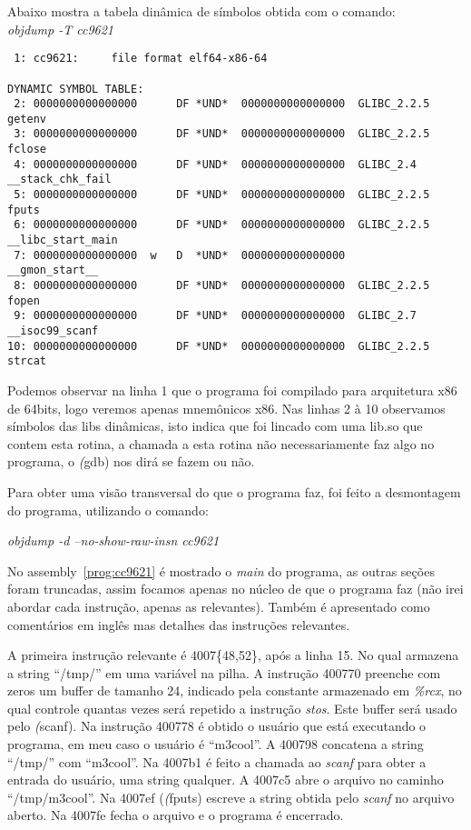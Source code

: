 Abaixo mostra a tabela dinâmica de símbolos obtida com o comando:\\
\emph{objdump -T cc9621}

\begin{verbatim}
 1: cc9621:     file format elf64-x86-64

DYNAMIC SYMBOL TABLE:
 2: 0000000000000000      DF *UND*	0000000000000000  GLIBC_2.2.5 getenv
 3: 0000000000000000      DF *UND*	0000000000000000  GLIBC_2.2.5 fclose
 4: 0000000000000000      DF *UND*	0000000000000000  GLIBC_2.4   __stack_chk_fail
 5: 0000000000000000      DF *UND*	0000000000000000  GLIBC_2.2.5 fputs
 6: 0000000000000000      DF *UND*	0000000000000000  GLIBC_2.2.5 __libc_start_main
 7: 0000000000000000  w   D  *UND*	0000000000000000              __gmon_start__
 8: 0000000000000000      DF *UND*	0000000000000000  GLIBC_2.2.5 fopen
 9: 0000000000000000      DF *UND*	0000000000000000  GLIBC_2.7   __isoc99_scanf
10: 0000000000000000      DF *UND*	0000000000000000  GLIBC_2.2.5 strcat
\end{verbatim}

Podemos observar na linha 1 que o programa foi compilado para
arquitetura x86 de 64bits, logo veremos apenas mnemônicos x86. Nas
linhas 2 à 10 observamos símbolos das libs dinâmicas, isto indica que
foi lincado com uma lib\*.so que contem esta rotina, a chamada a esta
rotina não necessariamente faz algo no programa, o \emph(gdb) nos dirá se
fazem ou não.

Para obter uma visão transversal do que o programa faz, foi feito a
desmontagem do programa, utilizando o comando:

\emph{objdump -d --no-show-raw-insn cc9621}



No assembly~\ref{prog:cc9621} é mostrado o \emph{main} do programa, as
outras seções foram truncadas, assim focamos apenas no núcleo de que o
programa faz (não irei abordar cada instrução, apenas as
relevantes). Também é apresentado como comentários em inglês mas
detalhes das instruções relevantes.

A primeira instrução relevante é 4007\{48,52\}, após a linha 15. No qual
armazena a string ``/tmp/'' em uma variável na pilha. A instrução
400770 preenche com zeros um buffer de tamanho 24, indicado pela
constante armazenado em \emph{\%rcx}, no qual controle quantas vezes será
repetido a instrução \emph{stos}. Este buffer será usado pelo
\emph(scanf). Na instrução 400778 é obtido o usuário que está
executando o programa, em meu caso o usuário é ``m3cool''. A 400798
concatena a string ``/tmp/'' com ``m3cool''. Na 4007b1 é feito a
chamada ao \emph{scanf} para obter a entrada do usuário, uma string
qualquer. A 4007c5 abre o arquivo no caminho ``/tmp/m3cool''. Na
4007ef (\emph(fputs) escreve a string obtida pelo \emph{scanf} no
arquivo aberto. Na 4007fe fecha o arquivo e o programa é encerrado.

